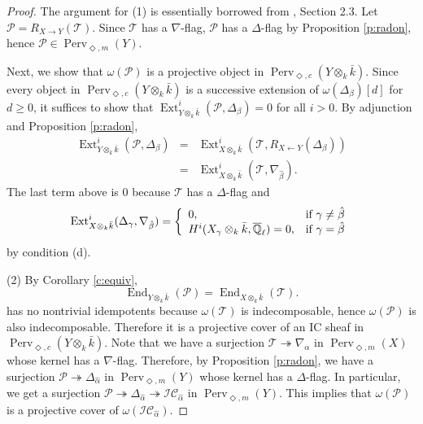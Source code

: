 \documentclass{amsart}
\theoremstyle{plain}
\theoremstyle{definition}
\theoremstyle{remark}
\numberwithin{equation}{subsection}
\begin{document}
\begin{proof}
The argument for (1) is essentially borrowed from \cite{BBM}, Section 2.3. Let ${\mathcal{P}}=R_{X\to Y}({\mathcal{T}})$.
Since ${\mathcal{T}}$ has a $\nabla$-flag, ${\mathcal{P}}$ has a $\Delta$-flag by Proposition \ref{p:radon}, hence ${\mathcal{P}}\in{\operatorname{Perv}_{\Diamond,m}({Y})}$.

Next, we show that $\omega({\mathcal{P}})$ is a projective object in ${\operatorname{Perv}_{\Diamond,c}({{{Y}}\otimes_k\bar{k}})}$. Since every object in ${\operatorname{Perv}_{\Diamond,c}({{{Y}}\otimes_k\bar{k}})}$ is a successive extension of $\omega(\Delta_\beta)[d]$ for $d\geq0$, it suffices to show that $\operatorname{Ext}_{{{Y}\otimes_k\bar{k}}}^i({\mathcal{P}},\Delta_\beta)=0$ for all $i>0$. By adjunction and Proposition \ref{p:radon},
\begin{eqnarray*}
\operatorname{Ext}_{{{Y}\otimes_k\bar{k}}}^i({\mathcal{P}},\Delta_\beta)&=&\operatorname{Ext}_{{{X}\otimes_k\bar{k}}}^i({\mathcal{T}},R_{X\leftarrow Y}(\Delta_\beta))\\
&=&\operatorname{Ext}_{{{X}\otimes_k\bar{k}}}^i({\mathcal{T}},\nabla_{\hat{\beta}}).
\end{eqnarray*}
The last term above is 0 because ${\mathcal{T}}$ has a $\Delta$-flag and
\begin{equation*}
\operatorname{Ext}_{{{X}\otimes_k\bar{k}}}^i(\Delta_\gamma,\nabla_{\hat{\beta}})=\left\{\begin{array}{ll}0,&\textup{if }\gamma\neq\hat{\beta}\\ H^i({{X_\gamma}\otimes_k\bar{k}},{\overline{\mathbb{Q}}_{\ell}})=0,&\textup{if }\gamma=\hat{\beta}\end{array}\right.
\end{equation*}
by condition (d).

(2) By Corollary \ref{c:equiv},
\begin{equation*}
\operatorname{End}_{{{Y}\otimes_k\bar{k}}}({\mathcal{P}})=\operatorname{End}_{{{X}\otimes_k\bar{k}}}({\mathcal{T}}).
\end{equation*}
has no nontrivial idempotents because $\omega({\mathcal{T}})$ is indecomposable, hence $\omega({\mathcal{P}})$ is also indecomposable. Therefore it is a projective cover of an IC sheaf in ${\operatorname{Perv}_{\Diamond,c}({{{Y}}\otimes_k\bar{k}})}$. Note that we have a surjection ${\mathcal{T}}\twoheadrightarrow\nabla_\alpha$ in ${\operatorname{Perv}_{\Diamond,m}({X})}$ whose kernel has a $\nabla$-flag. Therefore, by Proposition \ref{p:radon}, we have a surjection ${\mathcal{P}}\twoheadrightarrow\Delta_{\hat{\alpha}}$ in ${\operatorname{Perv}_{\Diamond,m}({Y})}$ whose kernel has a $\Delta$-flag. In particular, we get a surjection ${\mathcal{P}}\twoheadrightarrow\Delta_{\hat{\alpha}}\twoheadrightarrow{\mathcal{IC}}_{\hat{\alpha}}$ in ${\operatorname{Perv}_{\Diamond,m}({Y})}$. This implies that $\omega({\mathcal{P}})$ is a projective cover of $\omega({\mathcal{IC}}_{\hat{\alpha}})$. 


\end{proof}
\end{document}
